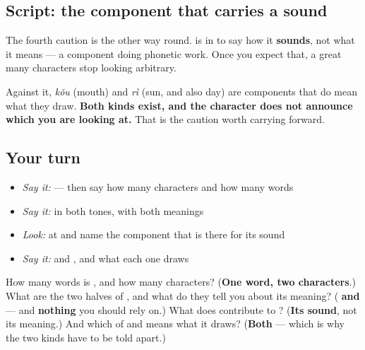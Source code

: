 \subsection*{Script: the component that carries a sound}
\begin{quote}
\end{quote}

The fourth caution is the other way round. \textbf{} is in  to say how it \textbf{sounds}, not what it means — a component doing phonetic work. Once you expect that, a great many characters stop looking arbitrary.

Against it,  \emph{kǒu} (mouth) and  \emph{rì} (sun, and also day) are components that do mean what they draw. \textbf{Both kinds exist, and the character does not announce which you are looking at.} That is the caution worth carrying forward.

\subsection*{Your turn}
\begin{itemize}
\raggedright
  \item \emph{Say it:}  — then say how many characters and how many words
  \item \emph{Say it:}  in both tones, with both meanings
  \item \emph{Look:} at  and name the component that is there for its sound
  \item \emph{Say it:}  and , and what each one draws
\end{itemize}

\begin{tcolorbox}[breakable,colback=teal!4,colframe=teal!35!black,title={Before you move on}]
How many words is , and how many characters? (\textbf{One word, two characters}.) What are the two halves of , and what do they tell you about its meaning? (\textbf{ and } — and \textbf{nothing} you should rely on.) What does  contribute to ? (\textbf{Its sound}, not its meaning.) And which of  and  means what it draws? (\textbf{Both} — which is why the two kinds have to be told apart.)
\end{tcolorbox}
